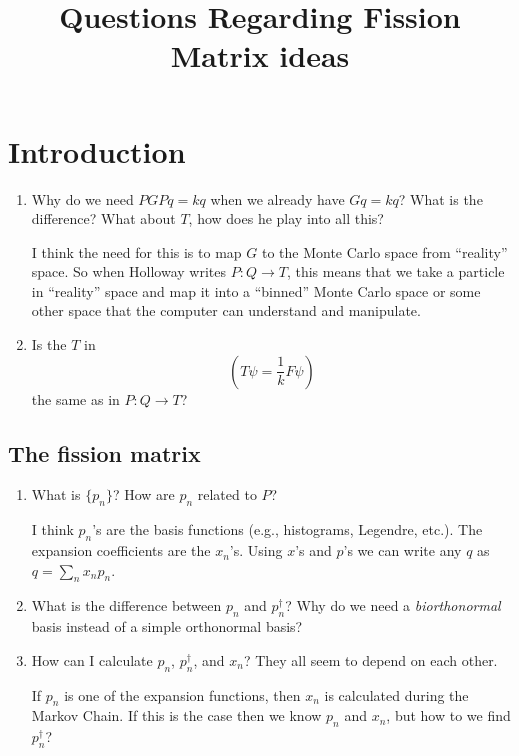 \documentclass[12pt]{article}
\title{Questions Regarding Fission Matrix ideas}
\begin{document}
\maketitle

\section{Introduction}
\begin{enumerate}
    \item Why do we need $PGPq = kq$ when we already have $Gq = kq$?  What is the difference?  What about $T$, how does he play into all this?
     
    I think the need for this is to map $G$ to the Monte Carlo space from ``reality'' space.  So when Holloway writes $P:Q\rightarrow T$, this means that we take a particle in ``reality'' space and map it into a ``binned'' Monte Carlo space or some other space that the computer can understand and manipulate.  \\[2in]

    \item Is the $T$ in 
    \begin{equation}
        \left(T\psi = \frac{1}{k}F\psi\right)
    \end{equation}
    the same as in $P:Q\rightarrow T$?

\end{enumerate}
\subsection{The fission matrix}
\begin{enumerate}
    \item What is $\{p_n\}$?  How are $p_n$ related to $P$?

    I think $p_n$'s are the basis functions (e.g., histograms, Legendre, etc.).  The expansion coefficients are the $x_n$'s.  Using $x$'s and $p$'s we can write any $q$ as $q = \sum_n x_np_n$.\\[1in]

    \item What is the difference between $p_n$ and $p_n^{\dagger}$?  Why do we need a \emph{biorthonormal} basis instead of a simple orthonormal basis?

    \item How can I calculate $p_n$, $p_n^{\dagger}$, and $x_n$?  They all seem to depend on each other.  

    If $p_n$ is one of the expansion functions, then $x_n$ is calculated during the Markov Chain.  If this is the case then we know $p_n$ and $x_n$, but how to we find $p_n^{\dagger}$?
\end{enumerate}
\end{document}

